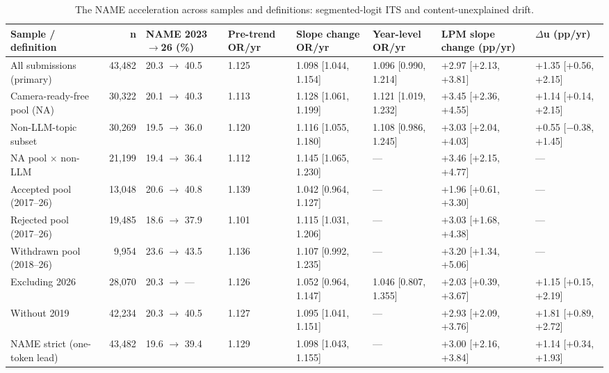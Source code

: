 \begin{landscape}
\begin{table}[p]
\centering
\scriptsize
\caption{The NAME acceleration across samples and definitions: segmented-logit ITS and content-unexplained drift.}
\label{tab:acceleration}
\begin{adjustbox}{max width=\linewidth}
\begin{tabular}{l r l l l l l l}
\toprule
Sample / definition & n & NAME 2023$\rightarrow$26 (\%) & Pre-trend OR/yr & Slope change OR/yr & Year-level OR/yr & LPM slope change (pp/yr) & $\Delta$u (pp/yr) \\
\midrule
All submissions (primary) & 43,482 & 20.3 $\rightarrow$ 40.5 & 1.125 & 1.098 [1.044, 1.154] & 1.096 [0.990, 1.214] & +2.97 [+2.13, +3.81] & +1.35 [+0.56, +2.15] \\
Camera-ready-free pool (NA) & 30,322 & 20.1 $\rightarrow$ 40.3 & 1.113 & 1.128 [1.061, 1.199] & 1.121 [1.019, 1.232] & +3.45 [+2.36, +4.55] & +1.14 [+0.14, +2.15] \\
Non-LLM-topic subset & 30,269 & 19.5 $\rightarrow$ 36.0 & 1.120 & 1.116 [1.055, 1.180] & 1.108 [0.986, 1.245] & +3.03 [+2.04, +4.03] & +0.55 [$-$0.38, +1.45] \\
NA pool $\times$ non-LLM & 21,199 & 19.4 $\rightarrow$ 36.4 & 1.112 & 1.145 [1.065, 1.230] & --- & +3.46 [+2.15, +4.77] & --- \\
Accepted pool (2017--26) & 13,048 & 20.6 $\rightarrow$ 40.8 & 1.139 & 1.042 [0.964, 1.127] & --- & +1.96 [+0.61, +3.30] & --- \\
Rejected pool (2017--26) & 19,485 & 18.6 $\rightarrow$ 37.9 & 1.101 & 1.115 [1.031, 1.206] & --- & +3.03 [+1.68, +4.38] & --- \\
Withdrawn pool (2018--26) & 9,954 & 23.6 $\rightarrow$ 43.5 & 1.136 & 1.107 [0.992, 1.235] & --- & +3.20 [+1.34, +5.06] & --- \\
Excluding 2026 & 28,070 & 20.3 $\rightarrow$ --- & 1.126 & 1.052 [0.964, 1.147] & 1.046 [0.807, 1.355] & +2.03 [+0.39, +3.67] & +1.15 [+0.15, +2.19] \\
Without 2019 & 42,234 & 20.3 $\rightarrow$ 40.5 & 1.127 & 1.095 [1.041, 1.151] & --- & +2.93 [+2.09, +3.76] & +1.81 [+0.89, +2.72] \\
NAME strict (one-token lead) & 43,482 & 19.6 $\rightarrow$ 39.4 & 1.129 & 1.098 [1.043, 1.155] & --- & +3.00 [+2.16, +3.84] & +1.14 [+0.34, +1.93] \\

\end{tabular}
\end{adjustbox}
\end{table}
\end{landscape}
